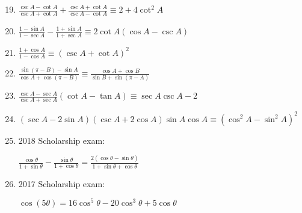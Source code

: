 \documentclass[../main.tex]{subfiles}
\begin{document}
\begin{enumerate}
    \setcounter{enumi}{18}
    \item $\frac{\csc{A}-\cot{A}}{\csc{A}+\cot{A}}+\frac{\csc{A}+\cot{A}}{\csc{A}-\cot{A}}\equiv 2+4\cot^2{A}$
    
    \item $\frac{1-\sin{A}}{1-\sec{A}}-\frac{1+\sin{A}}{1+\sec{A}}\equiv 2\cot{A}(\cos{A}-\csc{A})$
    
    \item $\frac{1+\cos{A}}{1-\cos{A}}\equiv (\csc{A}+\cot{A})^2$
    
    \item $\frac{\sin{(\pi-B)}-\sin{A}}{\cos{A}+\cos{(\pi - B)}}\equiv \frac{\cos{A}+\cos{B}}{\sin{B}+\sin{(\pi - A)}}$
    
    \item $\frac{\csc{A}-\sec{A}}{\csc{A}+\sec{A}}(\cot{A}-\tan{A})\equiv \sec{A}\csc{A}-2$
    
    \item $(\sec{A}-2\sin{A})(\csc{A}+2\cos{A})\sin{A}\cos{A}\equiv (\cos^2{A}-\sin^2{A})^2$
    
    \item 2018 Scholarship exam:
    
    $\frac{\cos{\theta}}{1+\sin{\theta}}-\frac{\sin{\theta}}{1+\cos{\theta}}=\frac{2(\cos{\theta}-\sin{\theta})}{1+\sin{\theta}+\cos{\theta}}$

    \item 2017 Scholarship exam:
    
    $\cos{(5\theta)}=16\cos^5{\theta}-20\cos^3{\theta}+5\cos{\theta}$
\end{enumerate}
\end{document}
